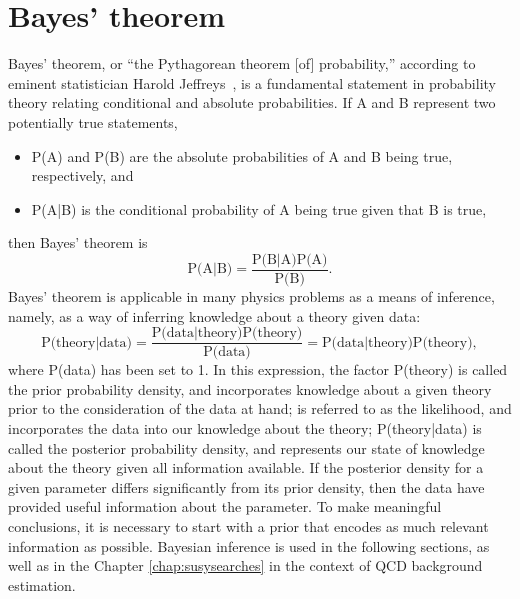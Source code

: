 \section{Bayes' theorem}
Bayes' theorem, or ``the Pythagorean theorem [of] probability,'' according to eminent statistician Harold Jeffreys~\cite{Jeffreys:Inference}, is a fundamental statement in probability theory relating conditional and absolute probabilities. If A and B represent two potentially true statements, 
\begin{itemize}
\item P(A) and P(B) are the absolute probabilities of A and B being true, respectively, and
\item P(A|B) is the conditional probability of A being true given that B is true,
\end{itemize}
then Bayes' theorem is
\begin{equation}
\text{P(A|B)}=\frac{\text{P(B|A)P(A)}}{\text{P(B)}}.
\end{equation}
Bayes' theorem is applicable in many physics problems as a means of inference, namely, as a way of inferring knowledge about a theory given data:
\begin{equation}
\text{P(theory|data)}=\frac{\text{P(data|theory)P(theory)}}{\text{P(data)}}=\text{P(data|theory)P(theory)},
\end{equation}
where P(data) has been set to 1. In this expression, the factor P(theory) is called the prior probability density, and incorporates knowledge about a given theory prior to the consideration of the data at hand;   is referred to as the likelihood, and incorporates the data into our knowledge about the theory; P(theory|data) is called the posterior probability density, and represents our state of knowledge about the theory given all information available. If the posterior density for a given parameter differs significantly from its prior density, then the data have provided useful information about the parameter. To make meaningful conclusions, it is necessary to start with a prior that encodes as much relevant information as possible. Bayesian inference is used in the following sections, as well as in the Chapter \ref{chap:susysearches} in the context of QCD background estimation.

